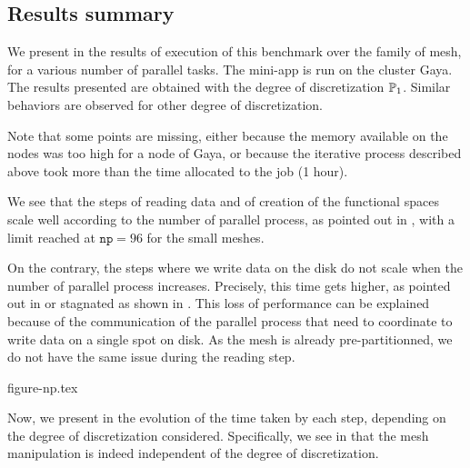 
\subsection{Results summary}



We present in  the results of execution of this benchmark over the family of mesh, for a various number of parallel tasks.
The mini-app is run on the cluster Gaya.
The results presented are obtained with the degree of discretization $\mathbb{P}_1$.
Similar behaviors are observed for other degree of discretization.

Note that some points are missing, either because the memory available on the nodes was too high for a node of Gaya, or because the iterative process described above took more than the time allocated to the job (1 hour).

We see that the steps of reading data and of creation of the functional spaces scale well according to the number of parallel process, as pointed out in , with a limit reached at $\texttt{np}=96$ for the small meshes.

On the contrary, the steps where we write data on the disk do not scale when the number of parallel process increases.
Precisely, this time gets higher, as pointed out in  or stagnated as shown in .
This loss of performance can be explained because of the communication of the parallel process that need to coordinate to write data on a single spot on disk.
As the mesh is already pre-partitionned, we do not have the same issue during the reading step.

{figure-np.tex}


\vspace{\baselineskip}

Now, we present in  the evolution of the time taken by each step, depending on the degree of discretization considered.
Specifically, we see in  that the mesh manipulation is indeed independent of the degree of discretization.

